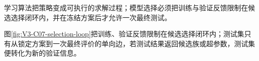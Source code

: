 \documentclass[UTF8,a4paper,11pt,openany]{ctexbook}
\begin{document}
\setcounter{page}{522}
\setcounter{chapter}{23}
\setcounter{figure}{0}
\pagestyle{headings}
\begin{geometrybox}
学习算法把策略变成可执行的求解过程；模型选择必须把训练与验证反馈限制在候选选择闭环内，并在冻结方案后才允许一次最终测试。
\end{geometrybox}

图\ref{fig:V3-C07-selection-loop}把训练、验证反馈限制在候选选择闭环内；测试集只有从锁定方案到一次最终评价的单向边，若测试结果返回候选族或超参数，测试集便转化为新的验证信息。
\end{document}
